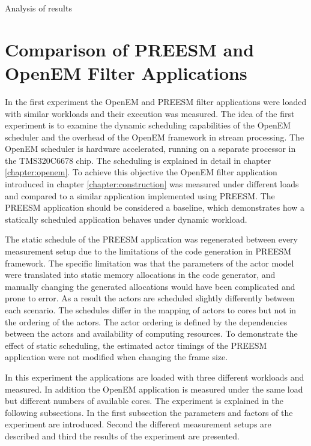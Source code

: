 Analysis of results


\section{Comparison of PREESM and OpenEM Filter Applications}
\label{sec:firstexperiment}
In the first experiment the OpenEM and PREESM filter applications were loaded
with similar workloads and their execution was measured. The idea of the first
experiment is to examine the dynamic scheduling capabilities of the OpenEM
scheduler and the overhead of the OpenEM framework in stream processing. The
OpenEM scheduler is hardware accelerated, running on a separate processor in the
TMS320C6678 chip. The scheduling is explained in detail in chapter
\ref{chapter:openem}. To achieve this objective the OpenEM filter application
introduced in chapter \ref{chapter:construction} was measured under different
loads and compared to a similar application implemented using PREESM. The
PREESM application should be considered a baseline, which demonstrates how a
statically scheduled application behaves under dynamic workload.

The static schedule of the PREESM application was regenerated between every
measurement setup due to the limitations of the code generation in PREESM
framework. The specific limitation was that the parameters of the actor model
were translated into static memory allocations in the code generator, and
manually changing the generated allocations would have been complicated and
prone to error. As a result the actors are scheduled slightly differently
between each scenario. The schedules differ in the mapping of actors to cores
but not in the ordering of the actors. The actor ordering is defined by the
dependencies between the actors and availability of computing resources. To
demonstrate the effect of static scheduling, the estimated actor timings of the
PREESM application were not modified when changing the frame size. 

In this experiment the applications are loaded with three different workloads
and measured. In addition the OpenEM application is measured under the same load
but different numbers of available cores. The experiment is explained in the
following subsections. In the first subsection the parameters and factors of the
experiment are introduced. Second the different measurement setups are described
and third the results of the experiment are presented.

